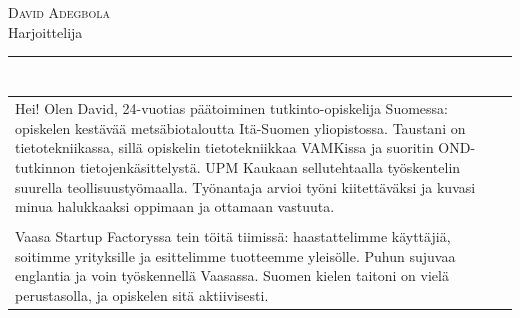 \documentclass[a4paper,11pt]{article}
\begin{document}
\small
\setlength{\cvlabelw}{3.9cm}
\titlespacing{\section}{0pt}{0.55em}{2pt}

\begin{cvheader}
\par{\centering
		{\Huge \textsc{David Adegbola}}\\[0.4em]
		{\Large Harjoittelija}
	\bigskip\par}

\hrule
\vspace{0.5em}
\end{cvheader}

\section{}
\begin{tabular}{p{}}
 Hei! Olen David, 24-vuotias päätoiminen tutkinto-opiskelija Suomessa: opiskelen kestävää metsäbiotaloutta Itä-Suomen yliopistossa. Taustani on tietotekniikassa, sillä opiskelin tietotekniikkaa VAMKissa ja suoritin OND-tutkinnon tietojenkäsittelystä. UPM Kaukaan sellutehtaalla työskentelin suurella teollisuustyömaalla. Työnantaja arvioi työni kiitettäväksi ja kuvasi minua halukkaaksi oppimaan ja ottamaan vastuuta.\\\\

 Vaasa Startup Factoryssa tein töitä tiimissä: haastattelimme käyttäjiä, soitimme yrityksille ja esittelimme tuotteemme yleisölle. Puhun sujuvaa englantia ja voin työskennellä Vaasassa. Suomen kielen taitoni on vielä perustasolla, ja opiskelen sitä aktiivisesti.
\end{tabular}

\section{}
\end{document}

